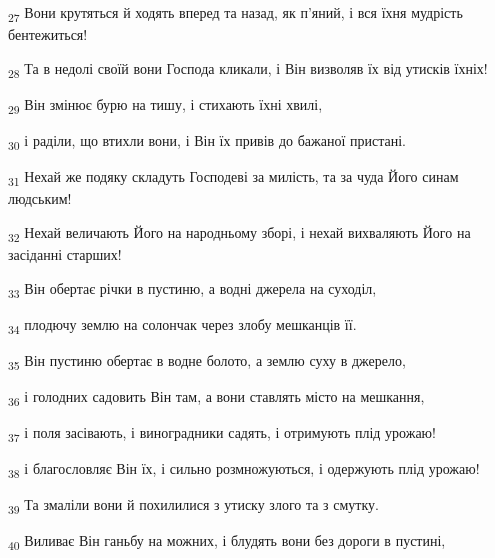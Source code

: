 \begin{tcolorbox}
\textsubscript{27} Вони крутяться й ходять вперед та назад, як п'яний, і вся їхня мудрість бентежиться!
\end{tcolorbox}
\begin{tcolorbox}
\textsubscript{28} Та в недолі своїй вони Господа кликали, і Він визволяв їх від утисків їхніх!
\end{tcolorbox}
\begin{tcolorbox}
\textsubscript{29} Він змінює бурю на тишу, і стихають їхні хвилі,
\end{tcolorbox}
\begin{tcolorbox}
\textsubscript{30} і раділи, що втихли вони, і Він їх привів до бажаної пристані.
\end{tcolorbox}
\begin{tcolorbox}
\textsubscript{31} Нехай же подяку складуть Господеві за милість, та за чуда Його синам людським!
\end{tcolorbox}
\begin{tcolorbox}
\textsubscript{32} Нехай величають Його на народньому зборі, і нехай вихваляють Його на засіданні старших!
\end{tcolorbox}
\begin{tcolorbox}
\textsubscript{33} Він обертає річки в пустиню, а водні джерела на суходіл,
\end{tcolorbox}
\begin{tcolorbox}
\textsubscript{34} плодючу землю на солончак через злобу мешканців її.
\end{tcolorbox}
\begin{tcolorbox}
\textsubscript{35} Він пустиню обертає в водне болото, а землю суху в джерело,
\end{tcolorbox}
\begin{tcolorbox}
\textsubscript{36} і голодних садовить Він там, а вони ставлять місто на мешкання,
\end{tcolorbox}
\begin{tcolorbox}
\textsubscript{37} і поля засівають, і виноградники садять, і отримують плід урожаю!
\end{tcolorbox}
\begin{tcolorbox}
\textsubscript{38} і благословляє Він їх, і сильно розмножуються, і одержують плід урожаю!
\end{tcolorbox}
\begin{tcolorbox}
\textsubscript{39} Та змаліли вони й похилилися з утиску злого та з смутку.
\end{tcolorbox}
\begin{tcolorbox}
\textsubscript{40} Виливає Він ганьбу на можних, і блудять вони без дороги в пустині,
\end{tcolorbox}
